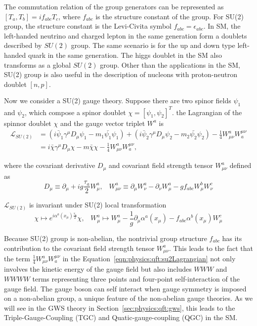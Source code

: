 \noindent The commutation relation of the group generators can be represented as $[T_a, T_b] = i f_{abc} T_c$, where $f_{abc}$ is the structure constant of the group. For SU(2) group, the structure constant is the Levi-Civita symbol $f_{abc}=\epsilon_{abc}$. In SM, the left-handed neutrino and charged lepton in the same generation form a doublets described by $SU(2)$ group. The same scenario is for the up and down type left-handed quark in the same generation. The higgs doublet in the SM also transforms as a global $SU(2)$ group. Other than the applications in the SM, SU(2) group is also useful in the description of nucleons with proton-neutron doublet $[n, p]$. 

\noindent Now we consider a SU(2) gauge theory. Suppose there are two spinor fields $\psi_1$ and $\psi_2$, which compose a spinor doublet $\chi = [ \psi_1, \psi_2 ]^T$. the Lagrangian of the spinnor doublet $\chi$ and the gauge vector triplet $W^a$ is
%
\begin{equation}
\begin{split}
    \mathcal{L}_{SU(2)}  &= (i\bar{\psi}_1\gamma^\mu D_\mu \psi_1  - m_1\bar{\psi_1} \psi_1) + (i\bar{\psi}_2\gamma^\mu D_\mu \psi_2  - m_2\bar{\psi_2} \psi_2)  - \frac{1}{4}W^a_{\mu\nu}W^{\mu\nu}_a \\
    &= i\bar{\chi}\gamma^\mu D_\mu \chi  - m\bar{\chi} \chi  - \frac{1}{4}W^a_{\mu\nu}W^{\mu\nu}_a,
\end{split}
\label{eqn:physics:qft:su2Lagrangian}
\end{equation}

\noindent where the covariant derivative $D_\mu$ and covariant field strength tensor $W^a_{\mu\nu}$ defined as
%
\begin{equation}
    D_\mu \equiv \partial_\mu +i g \frac{\tau_a}{2} W^a_\mu , \;\;\; 
    W^a_{\mu\nu} \equiv  \partial_\mu W^a_\nu - \partial_\nu W^a_\mu - g f_{abc} W^b_\mu W^c_\nu
\end{equation}

\noindent $\mathcal{L}_{SU(2)}$ is invariant under SU(2) local transformation 
%
\begin{equation}
	\chi \longmapsto  e^{i\alpha^a (x_\mu) \frac{\tau_a}{2}} \chi , \;\;\; 
    W^a_\mu \longmapsto  W^a_\mu - \frac{1}{g}\partial_\mu \alpha^a(x_\mu) - f_{abc}\alpha^b(x_\mu) W^c_\mu 
\end{equation}

\noindent Because SU(2) group is non-abelian, the nontrivial group structure $f_{abc}$ has its contribution to the covariant field strength tensor $W^a_{\mu\nu}$. This leads to the fact that the term $\frac{1}{4}W^a_{\mu\nu}W^{\mu\nu}_a$ in the Equation~\ref{eqn:physics:qft:su2Lagrangian} not only involves the kinetic energy of the gauge field but also includes $WWW$ and $WWWW$ terms representing three points and four-point self-interaction of the gauge field. The gauge boson can self interact when gauge symmetry is imposed on a non-abelian group, a unique feature of the non-abelian gauge theories. As we will see in the GWS theory in Section~\ref{sec:physics:qft:gws}, this leads to the Triple-Gauge-Coupling (TGC) and Quatic-gauge-coupling (QGC) in the SM.




